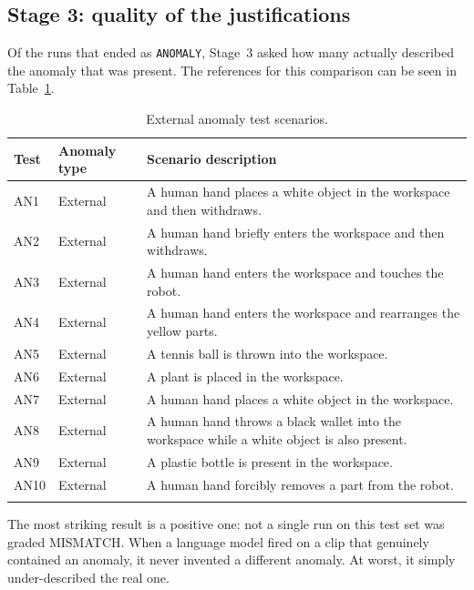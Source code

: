 \documentclass[11pt,a4paper]{article}
\begin{document}
\subsection{Stage 3: quality of the justifications}

Of the runs that ended as \texttt{ANOMALY}, Stage~3 asked how many
actually described the anomaly that was present. The references for this
comparison can be seen in Table~\ref{tab:test1-stage3-start}.

\begin{table}[htbp]
\centering
\caption{External anomaly test scenarios.}
\label{tab:external_anomaly_scenarios}
\begin{tabularx}{\textwidth}{@{}l l X@{}}
\toprule
\textbf{Test} & \textbf{Anomaly type} & \textbf{Scenario description} \\
\midrule
AN1 & External & A human hand places a white object in the workspace and then withdraws. \\
AN2 & External & A human hand briefly enters the workspace and then withdraws. \\
AN3 & External & A human hand enters the workspace and touches the robot. \\
AN4 & External & A human hand enters the workspace and rearranges the yellow parts. \\
AN5 & External & A tennis ball is thrown into the workspace. \\
AN6 & External & A plant is placed in the workspace. \\
AN7 & External & A human hand places a white object in the workspace. \\
AN8 & External & A human hand throws a black wallet into the workspace while a white object is also present. \\
AN9 & External & A plastic bottle is present in the workspace. \\
AN10 & External & A human hand forcibly removes a part from the robot. \\
\bottomrule
\label{tab:test1-stage3-start}
\end{tabularx}
\end{table}
\FloatBarrier

The most striking result is a positive one: not a single run on this test
set was graded MISMATCH. When a language model fired on a clip that
genuinely contained an anomaly, it never invented a different anomaly. At
worst, it simply under-described the real one.
\end{document}
